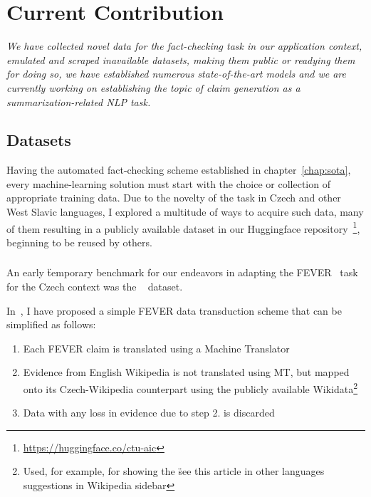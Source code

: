 
\chapter{Current Contribution}
\label{chap:contribution}

\textit{We have collected novel data for the fact-checking task in our application context, emulated and scraped inavailable datasets, making them public or readying them for doing so, we have established numerous state-of-the-art models and we are currently working on establishing the topic of claim generation as a summarization-related NLP task.}

\section{Datasets}
Having the automated fact-checking scheme established in chapter~\ref{chap:sota}, every machine-learning solution must start with the choice or collection of appropriate training data.
Due to the novelty of the task in Czech and other West Slavic languages, I explored a multitude of ways to acquire such data, many of them resulting in a publicly available dataset in our Huggingface repository~\footnote{\url{https://huggingface.co/ctu-aic}}, beginning to be reused by others. 

\subsection{\FCZ}\label{sec:fcz}
An early \"{temporary benchmark} for our endeavors in adapting the FEVER~\cite{fever} task for the Czech context was the \FCZ~\cite{lrev} dataset.

In~\cite{diplomka}, I have proposed a simple FEVER data transduction scheme that can be simplified as follows:

\begin{enumerate}
    \item Each FEVER claim is translated using a Machine Translator
    \item Evidence from English Wikipedia is not translated using MT, but mapped onto its Czech-Wikipedia counterpart using the publicly available Wikidata\footnote{Used, for example, for showing the \"{see this article in other languages} suggestions in Wikipedia sidebar}
    \item Data with any loss in evidence due to step 2. is discarded
\end{enumerate}

